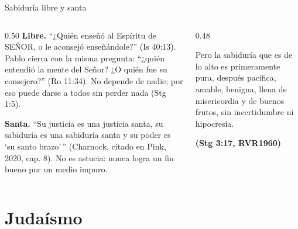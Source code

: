 \documentclass[hyperref={bookmarks=false},aspectratio=169]{beamer}
\newcommand{\SENOR}{S{\fontsize{0.78em}{1em}\selectfont EÑOR}}
\newcommand{\fuente}[1]{\par\hfill{\upshape\bfseries\footnotesize\textcolor{azul}{#1}}}
\newcommand{\destacar}[1]{\textbf{\textcolor{azul}{#1}}}
\begin{document}
\begin{frame}{Sabiduría libre y santa}
\begin{columns}[t,onlytextwidth]
\begin{column}{0.50\textwidth}\scriptsize
\destacar{Libre.} ``¿Quién enseñó al Espíritu de \SENOR{}, o le aconsejó enseñándole?'' (Is 40:13). Pablo cierra con la misma pregunta: ``¿quién entendió la mente del Señor? ¿O quién fue su consejero?'' (Ro 11:34). No depende de nadie; por eso puede darse a todos sin perder nada (Stg 1:5).\par\medskip
\destacar{Santa.} ``Su justicia es una justicia santa, su sabiduría es una sabiduría santa y su poder es `su santo brazo'\,'' (Charnock, citado en Pink, 2020, cap. 8). No es astucia: nunca logra un fin bueno por un medio impuro.
\end{column}
\begin{column}{0.48\textwidth}
\begin{cita}[fontupper=\scriptsize\itshape]Pero la sabiduría que es de lo alto es primeramente pura, después pacífica, amable, benigna, llena de misericordia y de buenos frutos, sin incertidumbre ni hipocresía.\fuente{(Stg 3:17, RVR1960)}\end{cita}
\end{column}
\end{columns}
\end{frame}

\section{Judaísmo}
\end{document}
